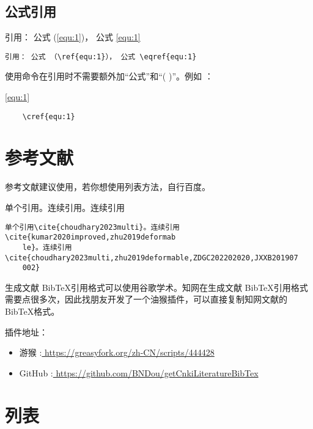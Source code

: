 \subsection{公式引用}
引用： 公式 (\ref{equ:1})， 公式 \eqref{equ:1}
\begin{lstlisting}
引用： 公式 （\ref{equ:1}）， 公式 \eqref{equ:1}
\end{lstlisting}

使用\myverb{\cref{}}命令在引用时不需要额外加“公式”和“( )”。例如 ：

\cref{equ:1}

\begin{lstlisting}
	\cref{equ:1}
\end{lstlisting}


\section{参考文献}
参考文献建议使用，若你想使用列表方法，自行百度。

单个引用\cite{choudhary2023multi}。连续引用\cite{kumar2020improved,zhu2019deformable}。连续引用\cite{choudhary2023multi,zhu2019deformable,ZDGC202202020,JXXB201907002}
\begin{lstlisting}
单个引用\cite{choudhary2023multi}。连续引用\cite{kumar2020improved,zhu2019deformab
	le}。连续引用\cite{choudhary2023multi,zhu2019deformable,ZDGC202202020,JXXB201907
	002}
\end{lstlisting}
生成文献 Bib\TeX 引用格式可以使用谷歌学术。知网在生成文献 Bib\TeX 引用格式需要点很多次，因此找朋友开发了一个油猴插件，可以直接复制知网文献的Bib\TeX 格式。

插件地址：\begin{itemize}
	\item 游猴 :\href{https://greasyfork.org/zh-CN/scripts/444428}{ \;\;https://greasyfork.org/zh-CN/scripts/444428}

	\item GitHub \faGithub :\href{https://github.com/BNDou/getCnkiLiteratureBibTex}{ \;\;https://github.com/BNDou/getCnkiLiteratureBibTex}
\end{itemize}

\section{列表}


